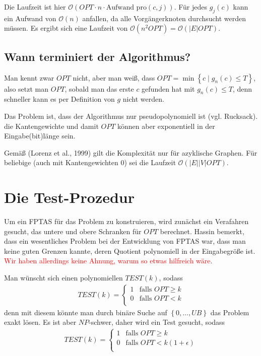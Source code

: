 \documentclass{article}
\begin{document}
Die Laufzeit ist hier $\mathcal{O}(OPT\cdot n \cdot \text{Aufwand pro
$(c,j)$})$. Für jedes $g_j(c)$ kann ein Aufwand von $\mathcal{O}\left(n\right)$ anfallen,
da alle Vorgängerknoten durchsucht werden müssen. Es ergibt sich eine Laufzeit
von $\mathcal{O}\left(n^2 OPT\right) = \mathcal{O}\left(|E| OPT\right)$.

\subsection{Wann terminiert der Algorithmus?}

Man kennt zwar $OPT$ nicht, aber man weiß, dass $OPT=\min\left\{c \mid g_n(c)
\le T\right\}$, also setzt man $OPT$, sobald man das erste $c$ gefunden hat mit 
$g_n(c)\le T$, denn schneller kann es per Definition von $g$ nicht werden.

Das Problem ist, dass der Algorithmus nur pseudopolynomiell ist (vgl. Rucksack).
die Kantengewichte und damit $OPT$ können aber exponentiell in der Eingabe(bit)länge sein.

Gemäß (Lorenz et al., 1999) gilt die Komplexität nur für azyklische Graphen. Für
beliebige (auch mit Kantengewichten $0$) sei die Laufzeit
$\mathcal{O}\left(|E||V|OPT\right)$.

\section{Die Test-Prozedur}

Um ein FPTAS für das Problem zu konstruieren, wird zunächst ein Verafahren
gesucht, das untere und obere Schranken für $OPT$ berechnet. Hassin bemerkt,
dass ein wesentliches Problem bei der Entwicklung von FPTAS war, dass man keine
guten Grenzen kannte, deren Quotient polynomiell in der Eingabegröße ist.
\textcolor{red}{Wir haben allerdings keine Ahnung, warum so etwas hilfreich wäre}.

Man wünscht sich einen polynomiellen $TEST(k)$, sodass 
\begin{align*}
   TEST(k) = 
   \begin{cases}
      1 & \text{falls } OPT \ge k \\
      0 & \text{falls } OPT < k \\
   \end{cases} 
\end{align*}
denn mit diesem könnte man durch binäre Suche auf $\left\{0,\ldots,UB\right\}$ das
Problem exakt lösen. Es ist aber $NP$-schwer, daher wird ein Test gesucht,
sodass
\begin{align*}
   TEST(k) = 
   \begin{cases}
      1 & \text{falls } OPT \ge k \\
      0 & \text{falls } OPT < k(1 + \epsilon) \\
   \end{cases} 
\end{align*}
\end{document}
